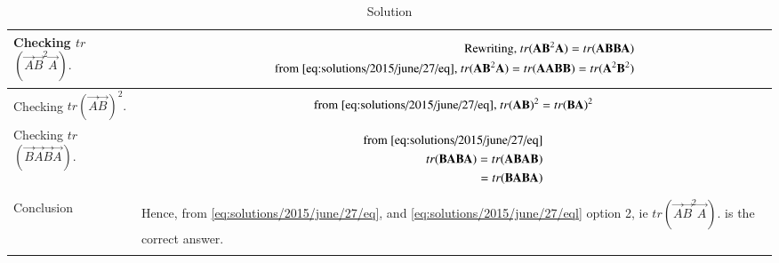 \begin{longtable}{|p{5cm}|p{13cm}|}
\hline
 Checking $tr$$(\vec{A} \vec{B}^2 \vec{A}).$&
\parbox{12cm}{\begin{align}\text{Rewriting,}
\  tr(\vec{A} \vec{B}^2 \vec{A}) =tr(\vec{A}\vec{B} \vec{B}\vec{A})\\\text{ from \eqref{eq:solutions/2015/june/27/eq},}\
 tr(\vec{A} \vec{B}^2 \vec{A})=  tr(\vec{A}\vec{A} \vec{B}\vec{B})\label{eq:solutions/2015/june/27/eql}=tr(\vec{A}^2 \vec{B}^2)  
\end{align}}\\
\hline
Checking $tr$$(\vec{A} \vec{B})^2.$&
\parbox{12cm}{\begin{align}\text{from \eqref{eq:solutions/2015/june/27/eq},}\
 tr(\vec{A} \vec{B})^2=tr(\vec{B}\vec{A})^2 
\end{align}}\\
\hline
 Checking $tr$$(\vec{B} \vec{A} \vec{B} \vec{A}).$&
\parbox{12cm}{\begin{align}\text{from \eqref{eq:solutions/2015/june/27/eq}}\\
 tr(\vec{B} \vec{A} \vec{B} \vec{A}) =tr(\vec{A}\vec{B} \vec{A}\vec{B})\\
 =tr(\vec{B}\vec{A} \vec{B}\vec{A})
 \end{align}}\\
\hline
 Conclusion&
Hence, from \eqref{eq:solutions/2015/june/27/eq}, and \eqref{eq:solutions/2015/june/27/eql} option 2, ie  $tr$$(\vec{A} \vec{B}^2 \vec{A}).$ is the correct answer.\\
\hline
\caption{Solution}
\label{eq:solutions/2015/june/27/Table1:}
\end{longtable}
\twocolumn

